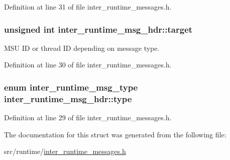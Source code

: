Definition at line 31 of file inter\-\_\-runtime\-\_\-messages.\-h.

\hypertarget{structinter__runtime__msg__hdr_ab55150bdbe4ae70e8e647f29f1568920}{
\subsubsection[{target}]{\setlength{\rightskip}{0pt plus 5cm}unsigned int inter\-\_\-runtime\-\_\-msg\-\_\-hdr\-::target}}\label{structinter__runtime__msg__hdr_ab55150bdbe4ae70e8e647f29f1568920}


M\-S\-U I\-D or thread I\-D depending on message type. 



Definition at line 30 of file inter\-\_\-runtime\-\_\-messages.\-h.

\hypertarget{structinter__runtime__msg__hdr_aa3fd1b24d760f993758fde89bc392667}{
\subsubsection[{type}]{\setlength{\rightskip}{0pt plus 5cm}enum {\bf inter\-\_\-runtime\-\_\-msg\-\_\-type} inter\-\_\-runtime\-\_\-msg\-\_\-hdr\-::type}}\label{structinter__runtime__msg__hdr_aa3fd1b24d760f993758fde89bc392667}


Definition at line 29 of file inter\-\_\-runtime\-\_\-messages.\-h.



The documentation for this struct was generated from the following file\-:\begin{DoxyCompactItemize}
\item 
src/runtime/\hyperlink{inter__runtime__messages_8h}{inter\-\_\-runtime\-\_\-messages.\-h}\end{DoxyCompactItemize}
